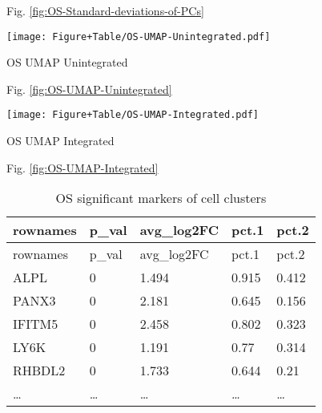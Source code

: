 \documentclass[
]{article}
\begin{document}
Fig. \ref{fig:OS-Standard-deviations-of-PCs}

\begin{center}\vspace{1.5cm}\end{center}
\def\@captype{figure}
\begin{center}
\texttt{[image: Figure+Table/OS-UMAP-Unintegrated.pdf]}
\caption{OS UMAP Unintegrated}\label{fig:OS-UMAP-Unintegrated}
\end{center}

\begin{center}\vspace{1.5cm}\end{center}

Fig. \ref{fig:OS-UMAP-Unintegrated}

\begin{center}\vspace{1.5cm}\end{center}
\def\@captype{figure}
\begin{center}
\texttt{[image: Figure+Table/OS-UMAP-Integrated.pdf]}
\caption{OS UMAP Integrated}\label{fig:OS-UMAP-Integrated}
\end{center}

\begin{center}\vspace{1.5cm}\end{center}

Fig. \ref{fig:OS-UMAP-Integrated}

\begin{center}\vspace{1.5cm}\end{center}

\begin{longtable}[]{@{}lllll@{}}
\caption{\label{tab:OS-significant-markers-of-cell-clusters}OS significant markers of cell clusters}\tabularnewline
\toprule
rownames & p\_val & avg\_log2FC & pct.1 & pct.2\tabularnewline
\midrule
\endfirsthead
\toprule
rownames & p\_val & avg\_log2FC & pct.1 & pct.2\tabularnewline
\midrule
\endhead
ALPL & 0 & 1.494 & 0.915 & 0.412\tabularnewline
PANX3 & 0 & 2.181 & 0.645 & 0.156\tabularnewline
IFITM5 & 0 & 2.458 & 0.802 & 0.323\tabularnewline
LY6K & 0 & 1.191 & 0.77 & 0.314\tabularnewline
RHBDL2 & 0 & 1.733 & 0.644 & 0.21\tabularnewline
\ldots{} & \ldots{} & \ldots{} & \ldots{} & \ldots{}\tabularnewline
\bottomrule
\end{longtable}
\end{document}
